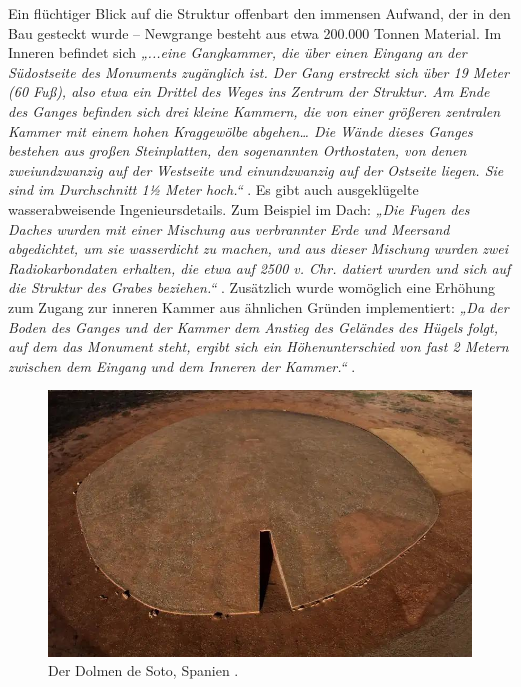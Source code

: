 \documentclass[10pt,twocolumn,letterpaper]{article}
\begin{document}
Ein flüchtiger Blick auf die Struktur offenbart den immensen Aufwand, der in den Bau gesteckt wurde – Newgrange besteht aus etwa 200.000 Tonnen Material. Im Inneren befindet sich \textit{„...eine Gangkammer, die über einen Eingang an der Südostseite des Monuments zugänglich ist. Der Gang erstreckt sich über 19 Meter (60 Fuß), also etwa ein Drittel des Weges ins Zentrum der Struktur. Am Ende des Ganges befinden sich drei kleine Kammern, die von einer größeren zentralen Kammer mit einem hohen Kraggewölbe abgehen… Die Wände dieses Ganges bestehen aus großen Steinplatten, den sogenannten Orthostaten, von denen zweiundzwanzig auf der Westseite und einundzwanzig auf der Ostseite liegen. Sie sind im Durchschnitt 1½ Meter hoch.“} \cite{70}. Es gibt auch ausgeklügelte wasserabweisende Ingenieursdetails. Zum Beispiel im Dach: \textit{„Die Fugen des Daches wurden mit einer Mischung aus verbrannter Erde und Meersand abgedichtet, um sie wasserdicht zu machen, und aus dieser Mischung wurden zwei Radiokarbondaten erhalten, die etwa auf 2500 v. Chr. datiert wurden und sich auf die Struktur des Grabes beziehen.“} \cite{71}. Zusätzlich wurde womöglich eine Erhöhung zum Zugang zur inneren Kammer aus ähnlichen Gründen implementiert: \textit{„Da der Boden des Ganges und der Kammer dem Anstieg des Geländes des Hügels folgt, auf dem das Monument steht, ergibt sich ein Höhenunterschied von fast 2 Metern zwischen dem Eingang und dem Inneren der Kammer.“} \cite{71}.

\begin{figure}[b]
\begin{center}
   \includegraphics[width=1\linewidth]{dolmen.jpg}
\end{center}
   \caption{Der Dolmen de Soto, Spanien \cite{53}.}
\label{fig:9}
\label{fig:onecol}
\end{figure}
\end{document}
